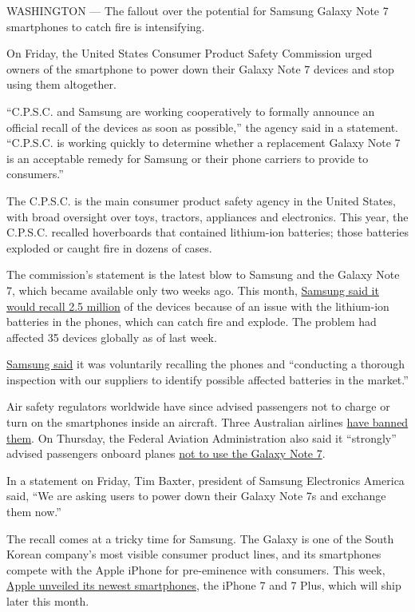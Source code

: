 WASHINGTON --- The fallout over the potential for Samsung Galaxy Note 7
smartphones to catch fire is intensifying.

On Friday, the United States Consumer Product Safety Commission urged
owners of the smartphone to power down their Galaxy Note 7 devices and
stop using them altogether.

``C.P.S.C. and Samsung are working cooperatively to formally announce an
official recall of the devices as soon as possible,'' the agency said in
a statement. ``C.P.S.C. is working quickly to determine whether a
replacement Galaxy Note 7 is an acceptable remedy for Samsung or their
phone carriers to provide to consumers.''

The C.P.S.C. is the main consumer product safety agency in the United
States, with broad oversight over toys, tractors, appliances and
electronics. This year, the C.P.S.C. recalled hoverboards that contained
lithium-ion batteries; those batteries exploded or caught fire in dozens
of cases.

The commission's statement is the latest blow to Samsung and the Galaxy
Note 7, which became available only two weeks ago. This month,
\href{http://www.nytimes.com/2016/09/03/business/samsung-galaxy-note-battery.html}{Samsung
said it would recall 2.5 million} of the devices because of an issue
with the lithium-ion batteries in the phones, which can catch fire and
explode. The problem had affected 35 devices globally as of last week.

\href{https://news.samsung.com/global/statement-on-galaxy-note7}{Samsung
said} it was voluntarily recalling the phones and ``conducting a
thorough inspection with our suppliers to identify possible affected
batteries in the market.''

Air safety regulators worldwide have since advised passengers not to
charge or turn on the smartphones inside an aircraft. Three Australian
airlines
\href{http://www.nytimes.com/reuters/2016/09/08/technology/08reuters-airlines-samsung.html}{have
banned them}. On Thursday, the Federal Aviation Administration also said
it ``strongly'' advised passengers onboard planes
\href{http://www.nytimes.com/2016/09/09/business/faa-strongly-advises-against-using-samsung-galaxy-note-7-on-planes.html}{not
to use the Galaxy Note 7}.

In a statement on Friday, Tim Baxter, president of Samsung Electronics
America said, ``We are asking users to power down their Galaxy Note 7s
and exchange them now.''

The recall comes at a tricky time for Samsung. The Galaxy is one of the
South Korean company's most visible consumer product lines, and its
smartphones compete with the Apple iPhone for pre-eminence with
consumers. This week,
\href{http://www.nytimes.com/2016/09/08/technology/iphone-7-apple-headphone-jack.html?ref=technology}{Apple
unveiled its newest smartphones}, the iPhone 7 and 7 Plus, which will
ship later this month.

